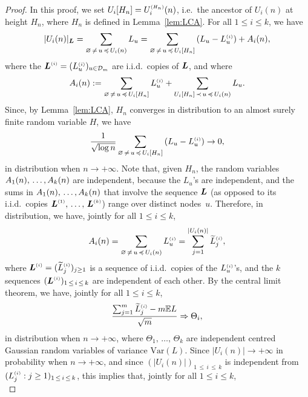 \documentclass[AHL,Unicode,longabstracts,published]{cedram}
\newcommand{\bs}{\ensuremath{\boldsymbol}}
\newcommand{\sss}{\ensuremath{\scriptscriptstyle}}
\newcommand{\bbE}{\mathbb{E}}
\newcommand{\clD}{\mathcal{D}}
\newcommand{\Var}{\mathrm{Var}}
\begin{document}
\begin{proof}
In this proof, we set $U_i[H_n] = U_i^{\sss (H_n)}(n)$, i.e.\ the ancestor of $U_i(n)$ at height $H_n$, where $H_n$ is defined in Lemma~\ref{lem:LCA}. For all $1\leq i\leq k$, we have
\begin{equation}\label{eq:Ai}
|U_i(n)|_{\bs L} = \sum_{\varnothing\,\neq\,u\,\preccurlyeq\,U_i(n)} L_u = \sum_{\varnothing\,\neq\,u\,\preccurlyeq\,U_i[H_n]} \left(L_u - L_u^{\sss (i)}\right) + A_i(n),
\end{equation}
where the $\bs L^{\sss (i)} = (L_u^{\sss (i)})_{u\in\clD_m}$ are i.i.d.\ copies of $\bs L$, and where
\[
A_i(n):=\sum_{\varnothing\,\neq\,u\,\preccurlyeq\,U_i[H_n]} L^{\sss (i)}_u +\sum_{U_i[H_n]\,\prec\,u\,\preccurlyeq\,U_i(n)} L_u.
\]
Since, by Lemma~\ref{lem:LCA}, $H_n$ converges in distribution to an almost surely finite random variable $H$, we have
\begin{equation}\label{eq:LLN_change_dist}
\frac1{\sqrt{\log n}}
\sum_{\varnothing\,\neq\,u\,\preccurlyeq\,U_i[H_n]}\left(L_u-L_u^{\sss (i)}\right)
\to 0,
\end{equation}
in distribution when $n\to+\infty$. Note that, given $H_n$, the random variables $A_1(n),\,\ldots,\linebreak A_k(n)$ are independent, because the $L_u$'s are independent, and the sums in $A_1(n), \,\ldots,\linebreak A_k(n)$ that involve the sequence $\bs L$ (as opposed to its i.i.d.\ copies $\bs L^{\sss (1)}, \,\ldots,\, \bs L^{\sss (k)}$) range over distinct nodes~$u$. Therefore, in distribution, we have, jointly for all $1\leq i\leq k$,
\[
A_i(n)= \sum_{\varnothing\,\neq\,u\,\preccurlyeq\,U_i(n)} L^{\sss (i)}_u = \sum_{j=1}^{|U_i(n)|} \widetilde L^{\sss (i)}_j,
\]
where $\bs L^{\sss (i)} = (\widetilde L_j^{\sss (i)})_{j\geq 1}$ is a sequence of i.i.d.\ copies of the $L^{\sss (i)}_u$'s, and the $k$ sequences $(\bs L^{\sss (i)})_{1\,\leq\,i\,\leq\,k}$ are independent of each other. By the central limit theorem, we have, jointly for all $1\leq i\leq k$,
\[
\frac{\sum_{j=1}^m \widetilde L^{\sss (i)}_j - m\bbE L}{\sqrt m} \Rightarrow \Theta_i,
\]
in distribution when $n\to+\infty$, where $\Theta_1, \,\ldots,\,\Theta_k$ are {independent centred Gaussian random variables of variance $\Var(L)$}. Since $|U_i(n)|\to+\infty$ in probability when $n\to+\infty$, and since $(|U_i(n)|)_{1\,\leq\,i\,\leq\,k}$ is independent from $(L_j^{\sss (i)} : j\geq 1)_{1\,\leq\,i\,\leq\,k}$, this implies that, jointly for all $1\leq i\leq k$,
\begin{equation}\label{eq:CLT_A_i}

\end{equation}
\end{proof}
\end{document}
